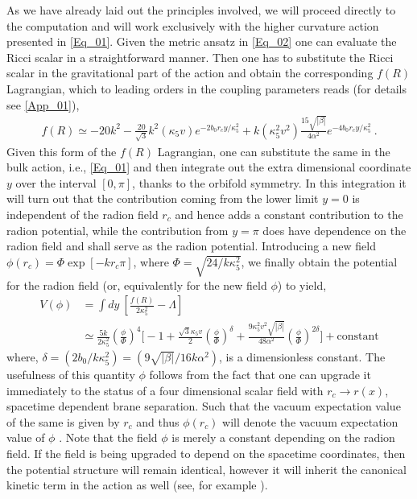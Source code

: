 \documentclass{article}
\begin{document}
As we have already laid out the principles involved, we will proceed directly to the computation and will work exclusively with the higher curvature action presented in \ref{Eq_01}. Given the metric ansatz in \ref{Eq_02} one can evaluate the Ricci scalar in a straightforward manner. Then one has to substitute the Ricci scalar in the gravitational part of the action and obtain the corresponding $f(R)$ Lagrangian, which to leading orders in the coupling parameters reads (for details see \ref{App_01}),
\begin{align}
f(R)\simeq -20k^{2}-\frac{20}{\sqrt{3}}k^{2}\left(\kappa _{5}v\right)e^{-2b_{0}r_{c}y/\kappa _{5}^{2}}+k\left(\kappa _{5}^{2}v^{2}\right)\frac{15\sqrt{|\beta|}}{4\alpha ^{2}} e^{-4b_{0}r_{c}y/\kappa _{5}^{2}}~.
\end{align}
Given this form of the $f(R)$ Lagrangian, one can substitute the same in the bulk action, i.e., \ref{Eq_01} and then integrate out the extra dimensional coordinate $y$ over the interval $[0,\pi]$, thanks to the orbifold symmetry. In this integration it will turn out that the contribution coming from the lower limit $y=0$ is independent of the radion field $r_{c}$ and hence adds a constant contribution to the radion potential, while the contribution from $y=\pi$ does have dependence on the radion field and shall serve as the radion potential. Introducing a new field $\phi(r_{c})=\Phi \exp[- kr_{c}\pi]$, where $\Phi =\sqrt{24/k\kappa _{5}^{2}}$, we finally obtain the potential for the radion field (or, equivalently for the new field $\phi$) to yield,
\begin{align}\label{Eq_04}
V(\phi)&=\int dy~\left[\frac{f(R)}{2\kappa _{5}^{2}}-\Lambda\right] 
\nonumber
\\
&\simeq \frac{5k}{2\kappa _{5}^{2}}\left(\frac{\phi}{\Phi}\right)^{4}\Bigg[-1+\frac{\sqrt{3}\kappa _{5}v}{2}\left(\frac{\phi}{\Phi}\right)^{\delta}+\frac{9\kappa _{5}^{2}v^{2}\sqrt{|\beta|}}{48\alpha ^{2}}\left(\frac{\phi}{\Phi}\right)^{2\delta}\Bigg]
+\textrm{constant}
\end{align}
where, $\delta =(2b_{0}/k \kappa _{5}^{2})=(9\sqrt{|\beta|}/16k\alpha ^{2})$, is a dimensionless constant. The usefulness of this quantity $\phi$ follows from the fact that one can upgrade it immediately to the status of a four dimensional scalar field with $r_{c}\rightarrow r(x)$, spacetime dependent brane separation. Such that the vacuum expectation value of the same is given by $r_{c}$ and thus $\phi(r_{c})$ will denote the vacuum expectation value of $\phi$ \cite{Goldberger:1999uk,Goldberger:1999un}. Note that the field $\phi$ is merely a constant depending on the radion field. If the field is being upgraded to depend on the spacetime coordinates, then the potential structure will remain identical, however it will inherit the canonical kinetic term in the action as well (see, for example \cite{Goldberger:1999un}). 
\end{document}
